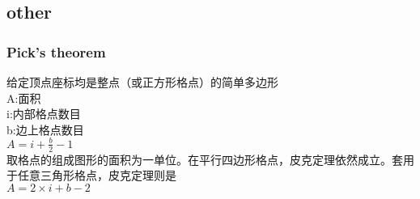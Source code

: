 \subsection{other}
\subsubsection{Pick's theorem}
给定顶点座标均是整点（或正方形格点）的简单多边形\\
A:面积\\
i:内部格点数目\\
b:边上格点数目\\
$A=i+\frac{b}{2}-1$\\

取格点的组成图形的面积为一单位。在平行四边形格点，皮克定理依然成立。套用于任意三角形格点，皮克定理则是\\
$A=2\times i+b-2$\\

